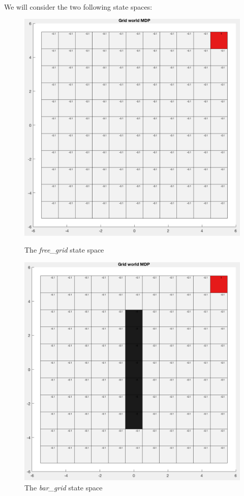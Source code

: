\documentclass[a4paper]{report}
\begin{document}
{{			\paragraph{} We will consider the two following state spaces: 
			\begin{figure}[ht!]
				\begin{minipage}{0.4\linewidth}
					\includegraphics[width=\linewidth]{free_grid}
					\caption{The \emph{free\_grid} state space}
				\end{minipage}
				\hfill
				\begin{minipage}{0.4\linewidth}
					\includegraphics[width=\linewidth]{bar_grid}
					\caption{The \emph{bar\_grid} state space}
				\end{minipage}
			\end{figure}
}}
\end{document}
